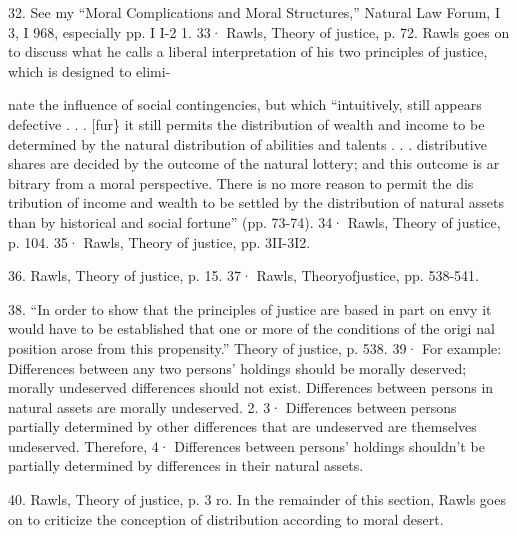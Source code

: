 \documentclass[11pt,openany]{book}
\begin{document}
{32. See my ``Moral Complications and Moral Structures,'' Natural Law Forum, I 3, I 968, especially pp. I I-2 1. 33· Rawls, Theory of justice, p. 72. Rawls goes on to discuss what he calls a liberal interpretation of his two principles of justice, which is designed to elimi-\par

nate the influence of social contingencies, but which ``intuitively, still appears defective . . . [fur\} it still permits the distribution of wealth and income to be determined by the natural distribution of abilities and talents . . . distributive shares are decided by the outcome of the natural lottery; and this outcome is ar bitrary from a moral perspective. There is no more reason to permit the dis tribution of income and wealth to be settled by the distribution of natural assets than by historical and social fortune'' (pp. 73-74). 34· Rawls, Theory of justice, p. 104. 35· Rawls, Theory of justice, pp. 3II-3I2.\par

36. Rawls, Theory of justice, p. 15. 37· Rawls, Theoryofjustice, pp. 538-541.\par

38. ``In order to show that the principles of justice are based in part on envy it would have to be established that one or more of the conditions of the origi nal position arose from this propensity.'' Theory of justice, p. 538. 39· For example: Differences between any two persons' holdings should be morally deserved; morally undeserved differences should not exist. Differences between persons in natural assets are morally undeserved. 2. 3· Differences between persons partially determined by other differences that are undeserved are themselves undeserved. Therefore, 4· Differences between persons' holdings shouldn't be partially determined by differences in their natural assets.\par

40. Rawls, Theory of justice, p. 3 ro. In the remainder of this section, Rawls goes on to criticize the conception of distribution according to moral desert.\par

}
\end{document}
